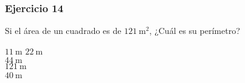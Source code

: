\begin{frame}
\frametitle{Ejercicio 14}
Si el área de un cuadrado es de $\SI{121}{\square\meter}$, ¿Cuál es su perímetro?
\medskip
\begin{choices}
\choice $\SI{11}{\meter}$
\choice $\SI{22}{\meter}$ \\
\choice $\SI{44}{\meter}$ \\
\choice $\SI{121}{\meter}$ \\
\choice $\SI{40}{\meter}$ \
\end{choices}
\pause
{}
\end{frame}
